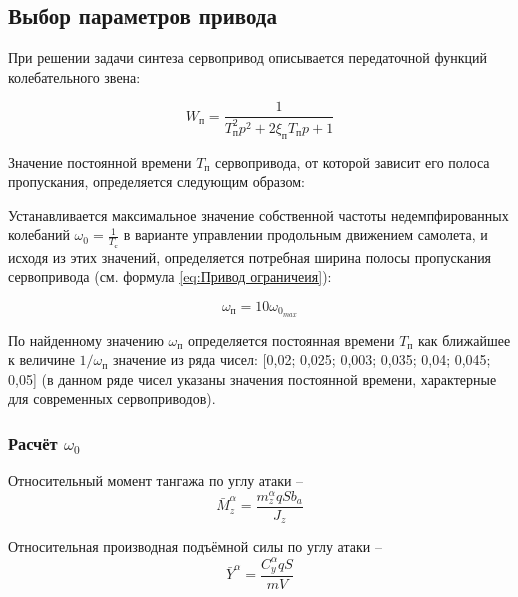 \subsection{Выбор параметров привода}
    
    При решении задачи синтеза сервопривод описывается передаточной функций колебательного звена:
    
    \begin{equation}
    \label{eq:Привод ограничеия}
        W_{\text{п}}=\frac{1}{T_\text{п}^2p^2+2\xi_\text{п}T_\text{п}p+1}
    \end{equation}
    
    Значение постоянной времени  $T_\text{п}$ сервопривода, от которой зависит его полоса пропускания, определяется следующим образом:
    
    Устанавливается максимальное значение собственной частоты  недемпфированных колебаний $\omega_0=\frac{1}{T_{\text{с}}}$ в варианте управлении продольным движением самолета, и исходя из этих значений, определяется потребная ширина полосы пропускания сервопривода (см. формула \ref{eq:Привод ограничеия}):
    
    \begin{equation}
        \label{eq:Собственная частота привода}
        \omega_\text{п}=10 \omega_{0_{max}}
    \end{equation}
    
    По найденному значению $\omega_\text{п}$ определяется постоянная времени  $T_\text{п}$ как ближайшее к величине $1/ \omega_\text{п}$  значение из ряда чисел: [0,02; 0,025; 0,003; 0,035; 0,04; 0,045; 0,05] (в данном ряде чисел указаны значения постоянной времени, характерные для современных сервоприводов).
    
    \subsubsection{Расчёт $\omega_0$}
    
    Относительный момент тангажа по углу атаки -- 
    \begin{equation}
        \label{eq:Относительный момент тангажа по углу атаки}
        \bar{M}_z^{\alpha} = \frac{m_z^{\alpha}qSb_a}{J_z}
    \end{equation}
    
    Относительная производная подъёмной силы по углу атаки --
    \begin{equation}
        \label{eq:Относительный момент тангажа по угловой скорости тангажа}
        \bar{Y}^\alpha=\frac{C_y^\alpha qS}{mV}
    \end{equation}
    
